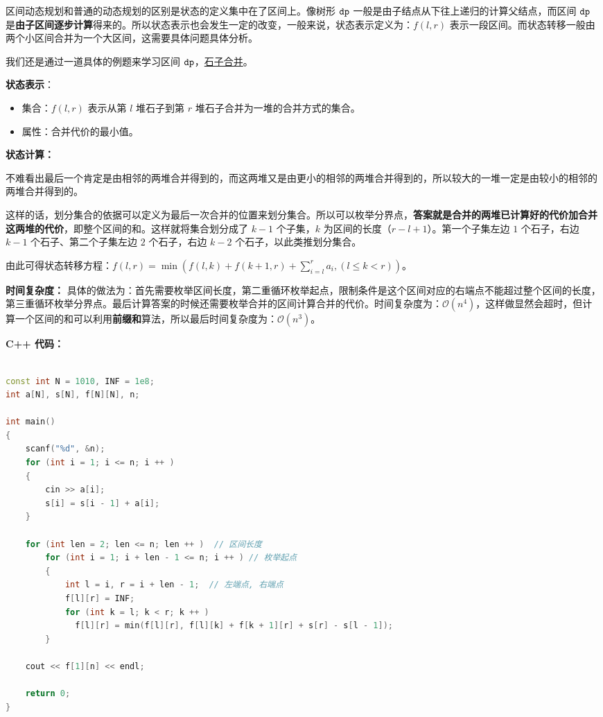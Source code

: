 
区间动态规划和普通的动态规划的区别是状态的定义集中在了区间上。像树形 $\tt dp$ 一般是由子结点从下往上递归的计算父结点，而区间 $\tt dp$ 是\textbf{由子区间逐步计算}得来的。所以状态表示也会发生一定的改变，一般来说，状态表示定义为：$f(l, r)$ 表示一段区间。而状态转移一般由两个小区间合并为一个大区间，这需要具体问题具体分析。

我们还是通过一道具体的例题来学习区间 $\tt dp$，\href{https://www.luogu.com.cn/problem/P1775}{石子合并}。

\textbf{状态表示}：
\begin{itemize}
\item 集合：$f(l, r)$ 表示从第 $l$ 堆石子到第 $r$ 堆石子合并为一堆的合并方式的集合。
\item 属性：合并代价的最小值。
\end{itemize}

\textbf{状态计算：}

不难看出最后一个肯定是由相邻的两堆合并得到的，而这两堆又是由更小的相邻的两堆合并得到的，所以较大的一堆一定是由较小的相邻的两堆合并得到的。

这样的话，划分集合的依据可以定义为最后一次合并的位置来划分集合。所以可以枚举分界点，\textbf{答案就是合并的两堆已计算好的代价加合并这两堆的代价}，即整个区间的和。这样就将集合划分成了 $k - 1$ 个子集，$k$ 为区间的长度（$r - l + 1$）。第一个子集左边 $1$ 个石子，右边 $k - 1$ 个石子、第二个子集左边 $2$ 个石子，右边 $k - 2$ 个石子，以此类推划分集合。

由此可得状态转移方程：$f(l, r) = \min(f(l, k) + f(k + 1, r) + \sum^{r}_{i = l}a_i, (l \leq k < r))$。

\textbf{时间复杂度：} 具体的做法为：首先需要枚举区间长度，第二重循环枚举起点，限制条件是这个区间对应的右端点不能超过整个区间的长度，第三重循环枚举分界点。最后计算答案的时候还需要枚举合并的区间计算合并的代价。时间复杂度为：$\mathcal{O}(n^4)$，这样做显然会超时，但计算一个区间的和可以利用\textbf{前缀和}算法，所以最后时间复杂度为：$\mathcal{O}(n^3)$。

\textbf{C++ 代码：}

\begin{lstlisting}[language=cpp]

const int N = 1010, INF = 1e8;
int a[N], s[N], f[N][N], n;

int main()
{
    scanf("%d", &n);
    for (int i = 1; i <= n; i ++ ) 
    {
        cin >> a[i];
        s[i] = s[i - 1] + a[i];
    }

    for (int len = 2; len <= n; len ++ )  // 区间长度
        for (int i = 1; i + len - 1 <= n; i ++ ) // 枚举起点
        {
            int l = i, r = i + len - 1;  // 左端点, 右端点
            f[l][r] = INF;
            for (int k = l; k < r; k ++ ) 
              f[l][r] = min(f[l][r], f[l][k] + f[k + 1][r] + s[r] - s[l - 1]);
        }

    cout << f[1][n] << endl;

    return 0;
}
\end{lstlisting}